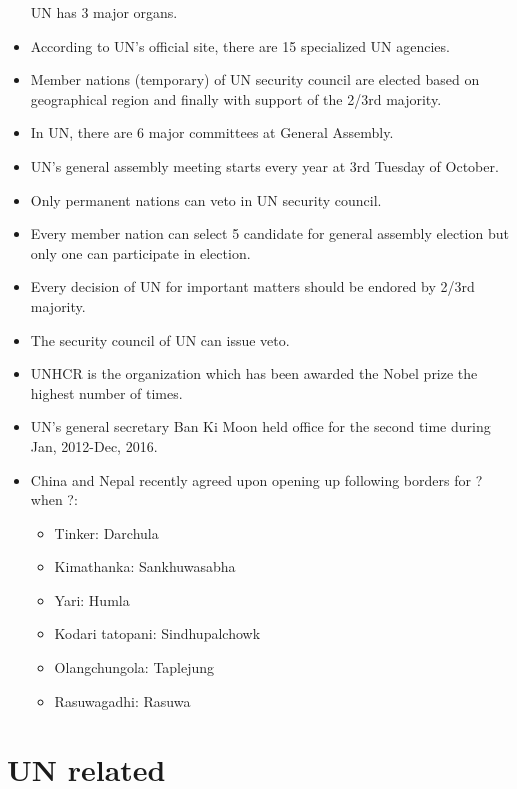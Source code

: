 \documentclass[
]{book}
\providecommand{\tightlist}{%
  \setlength{\itemsep}{0pt}\setlength{\parskip}{0pt}}
\begin{document}
\begin{itemize}
  UN has 3 major organs.
\item
  According to UN's official site, there are 15 specialized UN agencies.
\item
  Member nations (temporary) of UN security council are elected based on geographical region and finally with support of the 2/3rd majority.
\item
  In UN, there are 6 major committees at General Assembly.
\item
  UN's general assembly meeting starts every year at 3rd Tuesday of October.
\item
  Only permanent nations can veto in UN security council.
\item
  Every member nation can select 5 candidate for general assembly election but only one can participate in election.
\item
  Every decision of UN for important matters should be endored by 2/3rd majority.
\item
  The security council of UN can issue veto.
\item
  UNHCR is the organization which has been awarded the Nobel prize the highest number of times.
\item
  UN's general secretary Ban Ki Moon held office for the second time during Jan, 2012-Dec, 2016.
\item
  China and Nepal recently agreed upon opening up following borders for ? when ?:

  \begin{itemize}
  \tightlist
  \item
    Tinker: Darchula
  \item
    Kimathanka: Sankhuwasabha
  \item
    Yari: Humla
  \item
    Kodari tatopani: Sindhupalchowk
  \item
    Olangchungola: Taplejung
  \item
    Rasuwagadhi: Rasuwa
  \end{itemize}
\end{itemize}

\hypertarget{un-related}{%
\section{UN related}\label{un-related}}
\end{document}
